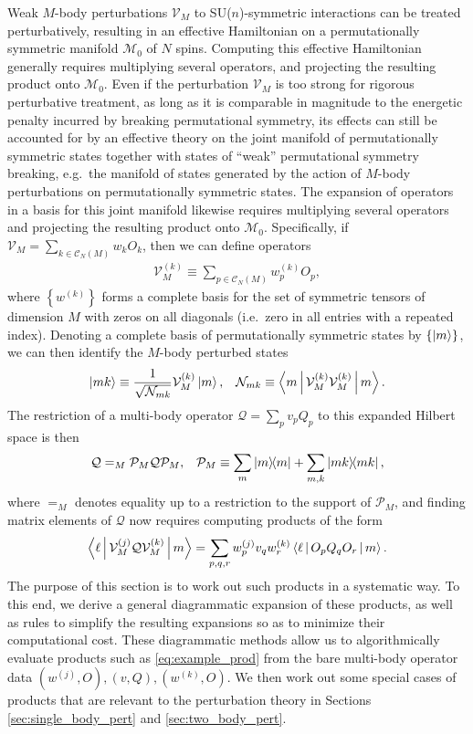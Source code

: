 \documentclass[nofootinbib,notitlepage,11pt]{revtex4-2}
\newcommand{\f}[2]{\dfrac{#1}{#2}} %
\newcommand{\p}[1]{\left(#1\right)} %
\renewcommand{\set}[1]{\left\{#1\right\}} %
\newcommand{\bk}{\Braket} %
\newcommand{\1}{\mathds{1}}
\newcommand{\C}{\mathcal{C}}
\newcommand{\M}{\mathcal{M}}
\newcommand{\N}{\mathcal{N}}
\renewcommand{\P}{\mathcal{P}}
\newcommand{\Q}{\mathcal{Q}}
\newcommand{\V}{\mathcal{V}}
\begin{document}
Weak $M$-body perturbations $\V_M$ to SU($n$)-symmetric interactions
can be treated perturbatively, resulting in an effective Hamiltonian
on a permutationally symmetric manifold $\M_0$ of $N$ spins.
Computing this effective Hamiltonian generally requires multiplying
several operators, and projecting the resulting product onto $\M_0$.
Even if the perturbation $\V_M$ is too strong for rigorous
perturbative treatment, as long as it is comparable in magnitude to
the energetic penalty incurred by breaking permutational symmetry, its
effects can still be accounted for by an effective theory on the joint
manifold of permutationally symmetric states together with states of
``weak'' permutational symmetry breaking, e.g.~the manifold of states
generated by the action of $M$-body perturbations on permutationally
symmetric states.  The expansion of operators in a basis for this
joint manifold likewise requires multiplying several operators and
projecting the resulting product onto $\M_0$.  Specifically, if
$\V_M=\sum_{k\in\C_N\p{M}}w_kO_k$, then we can define operators
\begin{align}
  \V_M^{(k)} \equiv \sum_{p\in\C_N\p{M}} w^{(k)}_p O_p,
\end{align}
where $\set{w^{(k)}}$ forms a complete basis for the set of symmetric
tensors of dimension $M$ with zeros on all diagonals (i.e.~zero in all
entries with a repeated index).  Denoting a complete basis of
permutationally symmetric states by $\set{\ket{m}}$, we can then
identify the $M$-body perturbed states
\begin{align}
  \ket{mk} \equiv \f1{\sqrt{\N_{mk}}} \V_M^{(k)} \ket{m},
  &&
  \N_{mk} \equiv \bk{m | \V_M^{(k)} \V_M^{(k)} | m}.
\end{align}
The restriction of a multi-body operator $\Q=\sum_p v_p Q_p$ to this
expanded Hilbert space is then
\begin{align}
  \Q =_M \P_M \Q \P_M,
  &&
  \P_M \equiv \sum_m \op{m} + \sum_{m,k} \op{mk},
\end{align}
where $=_M$ denotes equality up to a restriction to the support of
$\P_M$, and finding matrix elements of $\Q$ now requires computing
products of the form
\begin{align}
  \bk{\ell | \V_M^{(j)} \Q \V_M^{(k)} | m}
  = \sum_{p,q,r} w^{(j)}_p v_q w^{(k)}_r \bk{\ell | O_p Q_q O_r | m}.
  \label{eq:example_prod}
\end{align}
The purpose of this section is to work out such products in a
systematic way.  To this end, we derive a general diagrammatic
expansion of these products, as well as rules to simplify the
resulting expansions so as to minimize their computational cost.
These diagrammatic methods allow us to algorithmically evaluate
products such as \eqref{eq:example_prod} from the bare multi-body
operator data $\p{w^{(j)},O},\p{v,Q},\p{w^{(k)},O}$.  We then work out
some special cases of products that are relevant to the perturbation
theory in Sections \ref{sec:single_body_pert} and
\ref{sec:two_body_pert}.
\end{document}
